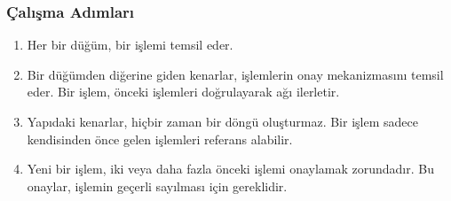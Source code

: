 \subsubsection{Çalışma Adımları}

\begin{enumerate}
    \item Her bir düğüm, bir işlemi temsil eder.
    \item Bir düğümden diğerine giden kenarlar, işlemlerin onay mekanizmasını temsil eder. Bir işlem, önceki işlemleri doğrulayarak ağı ilerletir.
    \item Yapıdaki kenarlar, hiçbir zaman bir döngü oluşturmaz. Bir işlem sadece kendisinden önce gelen işlemleri referans alabilir.
    \item Yeni bir işlem, iki veya daha fazla önceki işlemi onaylamak zorundadır. Bu onaylar, işlemin geçerli sayılması için gereklidir.
\end{enumerate}

\newpage